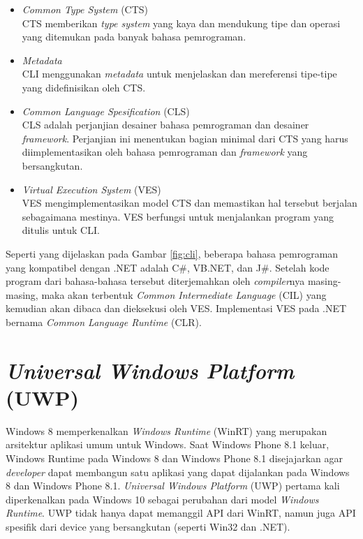 \begin{itemize}
    \item{\textit{Common Type System} (CTS)\\CTS memberikan \textit{type system} yang kaya dan mendukung tipe dan operasi yang ditemukan pada banyak bahasa pemrograman.}
    \item{\textit{Metadata}\\CLI menggunakan \textit{metadata} untuk menjelaskan dan mereferensi tipe-tipe yang didefinisikan oleh CTS.}
    \item{\textit{Common Language Spesification} (CLS)\\CLS adalah perjanjian desainer bahasa pemrograman dan desainer \textit{framework}. Perjanjian ini menentukan bagian minimal dari CTS yang harus diimplementasikan oleh bahasa pemrograman dan \textit{framework} yang bersangkutan.}
    \item{\textit{Virtual Execution System} (VES)\\VES mengimplementasikan model CTS dan memastikan hal tersebut berjalan sebagaimana mestinya. VES berfungsi untuk menjalankan program yang ditulis untuk CLI.}
\end{itemize}

Seperti yang dijelaskan pada Gambar \ref{fig:cli}, beberapa bahasa pemrograman yang kompatibel dengan .NET adalah C\#, VB.NET, dan J\#\cite{NET_PRIMER:2016}. Setelah kode program dari bahasa-bahasa tersebut diterjemahkan oleh \textit{compiler}nya masing-masing, maka akan terbentuk \textit{Common Intermediate Language} (CIL) yang kemudian akan dibaca dan dieksekusi oleh VES\cite{CLI:2016}. Implementasi VES pada .NET bernama \textit{Common Language Runtime} (CLR).



\section{\textit{Universal Windows Platform} (UWP)}
\label{sec:uwp}

Windows 8 memperkenalkan \textit{Windows Runtime} (WinRT) yang merupakan arsitektur aplikasi umum untuk Windows\cite{UWP:2016}. Saat Windows Phone 8.1 keluar, Windows Runtime pada Windows 8 dan Windows Phone 8.1 disejajarkan agar \textit{developer} dapat membangun satu aplikasi yang dapat dijalankan pada Windows 8 dan Windows Phone 8.1. \textit{Universal Windows Platform} (UWP) pertama kali diperkenalkan pada Windows 10 sebagai perubahan dari model \textit{Windows Runtime}. UWP tidak hanya dapat memanggil API dari WinRT, namun juga API spesifik dari device yang bersangkutan (seperti Win32 dan .NET).



